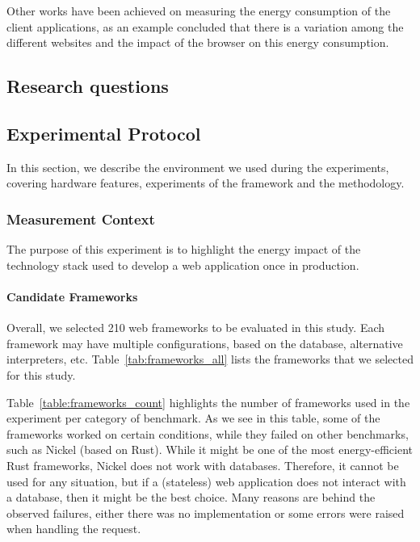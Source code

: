Other works have been achieved on measuring the energy consumption of the client applications, as an example \cite{philippot_characterization_2014} concluded that there is a variation among the different websites and the impact of the browser on this energy consumption.

\subsection{Research questions }


\subsection{Experimental Protocol}
In this section, we describe the environment we used during the experiments, covering hardware features, experiments of the framework and the methodology.

\subsubsection{Measurement Context}
The purpose of this experiment is to highlight the energy impact of the technology stack used to develop a web application once in production.

\paragraph{Candidate Frameworks}
Overall, we selected 210 web frameworks to be evaluated in this study.
Each framework may have multiple configurations, based on the database, alternative interpreters, etc.
Table~\ref{tab:frameworks_all} lists the frameworks that we selected for this study.

% 
Table~\ref{table:frameworks_count} highlights the number of frameworks used in the experiment per category of benchmark.
As we see in this table, some of the frameworks worked on certain conditions, while they failed on other benchmarks, such as Nickel (based on Rust).
While it might be one of the most energy-efficient Rust frameworks, Nickel does not work with databases.
Therefore, it cannot be used for any situation, but if a (stateless) web application does not interact with a database, then it might be the best choice.
Many reasons are behind the observed failures, either there was no implementation or some errors were raised when handling the request.

